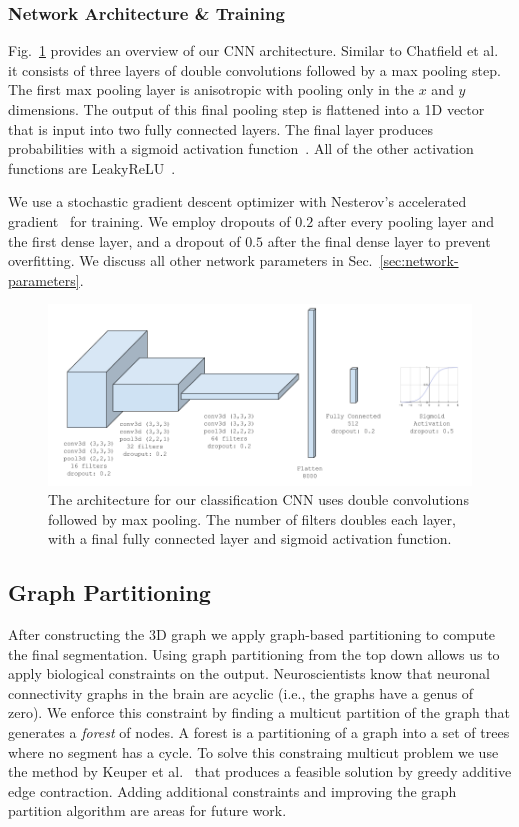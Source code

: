 \subsubsection{Network Architecture \& Training}

Fig.~\ref{fig:architecture} provides an overview of our CNN architecture. Similar to Chatfield et al.~\cite{chatfield2014return} it consists of three layers of double convolutions followed by a max pooling step. The first max pooling layer is anisotropic with pooling only in the $x$ and $y$ dimensions. The output of this final pooling step is flattened into a 1D vector that is input into two fully connected layers. The final layer produces probabilities with a sigmoid activation function~\cite{funahashi1989approximate}. All of the other activation functions are LeakyReLU~\cite{maas2013rectifier}.

We use a stochastic gradient descent optimizer with Nesterov's accelerated gradient~\cite{nesterov1983method} for training. We employ dropouts of $0.2$ after every pooling layer and the first dense layer, and a dropout of $0.5$ after the final dense layer to prevent overfitting. We discuss all other network parameters in Sec.~\ref{sec:network-parameters}.

\begin{figure}[t]
	\centering
	\includegraphics[width=0.85\linewidth]{figures/architecture.png}
	\caption{The architecture for our classification CNN uses double convolutions followed by max pooling. The number of filters doubles each layer, with a final fully connected layer and sigmoid activation function.}
	\label{fig:architecture}
\end{figure}

\subsection{Graph Partitioning}

After constructing the 3D graph we apply graph-based partitioning to compute the final segmentation. Using graph partitioning from the top down allows us to apply biological constraints on the output. Neuroscientists know that neuronal connectivity graphs in the brain are acyclic (i.e., the graphs have a genus of zero). We enforce this constraint by finding a multicut partition of the graph that generates a \textit{forest} of nodes. A forest is a partitioning of a graph into a set of trees where no segment has a cycle. To solve this constraing multicut problem we use the method by Keuper et al.~\cite{keuper2015efficient} that produces a feasible solution by greedy additive edge contraction. Adding additional constraints and improving the graph partition algorithm are areas for future work.
